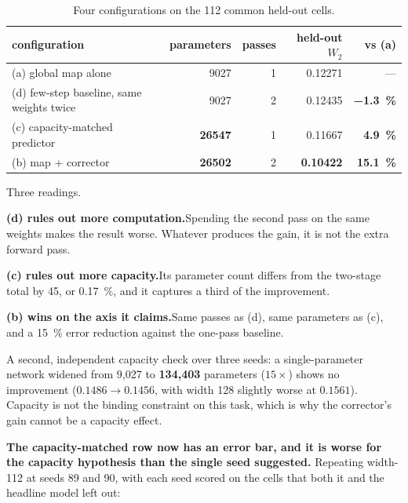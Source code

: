 ﻿\documentclass[11pt,a4paper]{article}
\newcommand{\Wtwo}{W_2}
\begin{document}
\begin{table}[h]
\centering\small
\begin{tabular}{@{}lrrrr@{}}
\toprule
configuration & parameters & passes & held-out $\Wtwo$ & vs (a) \\
\midrule
(a) global map alone & \num{9027} & 1 & 0.12271 & --- \\
(d) few-step baseline, same weights twice & \num{9027} & 2 & 0.12435 &
  \textbf{\SI{-1.3}{\percent}} \\
(c) capacity-matched predictor & \textbf{\num{26547}} & 1 & 0.11667 &
  \textbf{\SI{4.9}{\percent}} \\
(b) map + corrector & \textbf{\num{26502}} & 2 & \textbf{0.10422} &
  \textbf{\SI{15.1}{\percent}} \\
\bottomrule
\end{tabular}
\caption{Four configurations on the 112 common held-out cells.}
\label{tab:fourway}
\end{table}

Three readings.

\textbf{(d) rules out more computation.}\hspace{0.4em}Spending the second pass on the same weights
makes the result worse. Whatever produces the gain, it is not the extra forward pass.

\textbf{(c) rules out more capacity.}\hspace{0.4em}Its parameter count differs from the two-stage
total by 45, or \SI{0.17}{\percent}, and it captures a third of the improvement.

\textbf{(b) wins on the axis it claims.}\hspace{0.4em}Same passes as (d), same parameters as (c),
and a \SI{15}{\percent} error reduction against the one-pass baseline.

A second, independent capacity check over three seeds: a single-parameter network widened from
9{,}027 to \textbf{134{,}403} parameters ($15\times$) shows no improvement ($0.1486\to0.1456$, with
width 128 slightly worse at $0.1561$). Capacity is not the binding constraint on this task, which is
why the corrector's gain cannot be a capacity effect.

\textbf{The capacity-matched row now has an error bar, and it is worse for the capacity hypothesis
than the single seed suggested.} Repeating width-112 at seeds 89 and 90, with each seed scored on the
cells that both it and the headline model left out:
\end{document}
